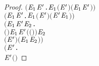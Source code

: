 \begin{proof}
\begin{alltt}
       \ensuremath{(}\HOLSymConst{\HOLTokenForall{}}  \ensuremath{\HOLBoundVar{E}\sb{\mathrm{1}}} \ensuremath{\HOLBoundVar{E}\sp{\prime}}.    \ensuremath{\HOLBoundVar{E}\sb{\mathrm{1}}} \HOLSymConst{\HOLTokenImp{}}  \ensuremath{(} \HOLSymConst{\ensuremath{\mid}} \ensuremath{\HOLBoundVar{E}\sp{\prime}}\ensuremath{)}  \ensuremath{(}\ensuremath{\HOLBoundVar{E}\sb{\mathrm{1}}} \HOLSymConst{\ensuremath{\mid}} \ensuremath{\HOLBoundVar{E}\sp{\prime}}\ensuremath{)}\ensuremath{)} \HOLSymConst{\HOLTokenConj{}}
       \ensuremath{(}\HOLSymConst{\HOLTokenForall{}}  \ensuremath{\HOLBoundVar{E}\sb{\mathrm{1}}} \ensuremath{\HOLBoundVar{E}\sp{\prime}}.    \ensuremath{\HOLBoundVar{E}\sb{\mathrm{1}}} \HOLSymConst{\HOLTokenImp{}}  \ensuremath{(}\ensuremath{\HOLBoundVar{E}\sp{\prime}} \HOLSymConst{\ensuremath{\mid}} \ensuremath{)}  \ensuremath{(}\ensuremath{\HOLBoundVar{E}\sp{\prime}} \HOLSymConst{\ensuremath{\mid}} \ensuremath{\HOLBoundVar{E}\sb{\mathrm{1}}}\ensuremath{)}\ensuremath{)} \HOLSymConst{\HOLTokenConj{}}
       \ensuremath{(}\HOLSymConst{\HOLTokenForall{}}  \ensuremath{\HOLBoundVar{E}\sb{\mathrm{1}}} \ensuremath{\HOLBoundVar{E}\sp{\prime}} \ensuremath{\HOLBoundVar{E}\sb{\mathrm{2}}}.
              \ensuremath{(} \ensuremath{)} \ensuremath{\HOLBoundVar{E}\sb{\mathrm{1}}} \HOLSymConst{\HOLTokenConj{}}  \ensuremath{\HOLBoundVar{E}\sp{\prime}} \ensuremath{(} \ensuremath{(} \ensuremath{)}\ensuremath{)} \ensuremath{\HOLBoundVar{E}\sb{\mathrm{2}}} \HOLSymConst{\HOLTokenImp{}}
             \ensuremath{(} \HOLSymConst{\ensuremath{\mid}} \ensuremath{\HOLBoundVar{E}\sp{\prime}}\ensuremath{)} \HOLSymConst{\ensuremath{\tau}} \ensuremath{(}\ensuremath{\HOLBoundVar{E}\sb{\mathrm{1}}} \HOLSymConst{\ensuremath{\mid}} \ensuremath{\HOLBoundVar{E}\sb{\mathrm{2}}}\ensuremath{)}\ensuremath{)} \HOLSymConst{\HOLTokenConj{}}
       \ensuremath{(}\HOLSymConst{\HOLTokenForall{}}  \ensuremath{\HOLBoundVar{E}\sp{\prime}}  .
               \ensuremath{\HOLBoundVar{E}\sp{\prime}} \HOLSymConst{\HOLTokenConj{}} \ensuremath{(} \HOLSymConst{\ensuremath{=}} \HOLSymConst{\ensuremath{\tau}} \HOLSymConst{\HOLTokenDisj{}}  \HOLSymConst{\ensuremath{=}}   \HOLSymConst{\HOLTokenConj{}}  \HOLSymConst{\HOLTokenNotIn{}}  \HOLSymConst{\HOLTokenConj{}}   \HOLSymConst{\HOLTokenNotIn{}} \ensuremath{)} \HOLSymConst{\HOLTokenImp{}}

\end{alltt}
\end{proof}
